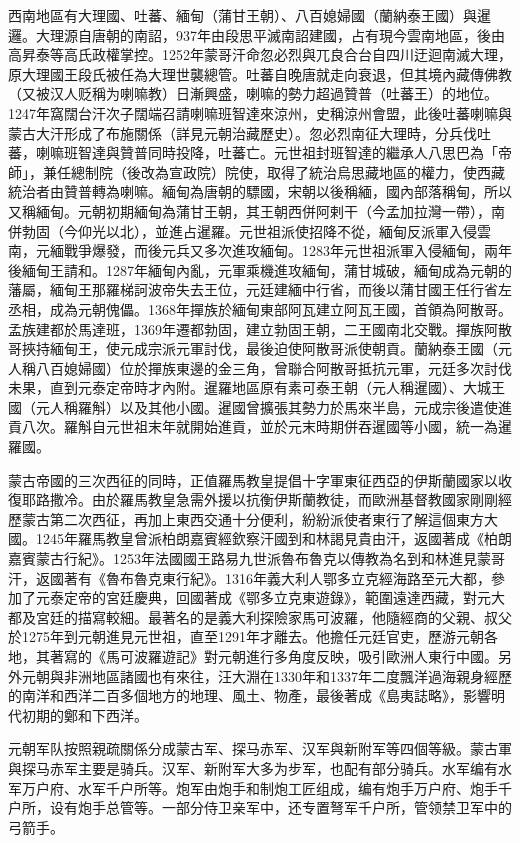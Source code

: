 西南地區有大理國、吐蕃、緬甸（蒲甘王朝）、八百媳婦國（蘭納泰王國）與暹邏。大理源自唐朝的南詔，937年由段思平滅南詔建國，占有現今雲南地區，後由高昇泰等高氏政權掌控。1252年蒙哥汗命忽必烈與兀良合台自四川迂迴南滅大理，原大理國王段氏被任為大理世襲總管。吐蕃自晚唐就走向衰退，但其境內藏傳佛教（又被汉人贬稱为喇嘛教）日漸興盛，喇嘛的勢力超過贊普（吐蕃王）的地位。1247年窩闊台汗次子闊端召請喇嘛班智達來涼州，史稱涼州會盟，此後吐蕃喇嘛與蒙古大汗形成了布施關係（詳見元朝治藏歷史）。忽必烈南征大理時，分兵伐吐蕃，喇嘛班智達與贊普同時投降，吐蕃亡。元世祖封班智達的繼承人八思巴為「帝師」，兼任總制院（後改為宣政院）院使，取得了統治烏思藏地區的權力，使西藏統治者由贊普轉為喇嘛。緬甸為唐朝的驃國，宋朝以後稱緬，國內部落稱甸，所以又稱緬甸。元朝初期緬甸為蒲甘王朝，其王朝西併阿剌干（今孟加拉灣一帶），南併勃固（今仰光以北），並進占暹羅。元世祖派使招降不從，緬甸反派軍入侵雲南，元緬戰爭爆發，而後元兵又多次進攻緬甸。1283年元世祖派軍入侵緬甸，兩年後緬甸王請和。1287年緬甸內亂，元軍乘機進攻緬甸，蒲甘城破，緬甸成為元朝的藩屬，緬甸王那羅梯訶波帝失去王位，元廷建緬中行省，而後以蒲甘國王任行省左丞相，成為元朝傀儡。1368年撣族於緬甸東部阿瓦建立阿瓦王國，首領為阿散哥。孟族建都於馬達班，1369年遷都勃固，建立勃固王朝，二王國南北交戰。撣族阿散哥挾持緬甸王，使元成宗派元軍討伐，最後迫使阿散哥派使朝貢。蘭納泰王國（元人稱八百媳婦國）位於撣族東邊的金三角，曾聯合阿散哥抵抗元軍，元廷多次討伐未果，直到元泰定帝時才內附。暹羅地區原有素可泰王朝（元人稱暹國）、大城王國（元人稱羅斛）以及其他小國。暹國曾擴張其勢力於馬來半島，元成宗後遣使進貢八次。羅斛自元世祖末年就開始進貢，並於元末時期併吞暹國等小國，統一為暹羅國。

蒙古帝國的三次西征的同時，正值羅馬教皇提倡十字軍東征西亞的伊斯蘭國家以收復耶路撒冷。由於羅馬教皇急需外援以抗衡伊斯蘭教徒，而歐洲基督教國家剛剛經歷蒙古第二次西征，再加上東西交通十分便利，紛紛派使者東行了解這個東方大國。1245年羅馬教皇曾派柏朗嘉賓經欽察汗國到和林謁見貴由汗，返國著成《柏朗嘉賓蒙古行紀》。1253年法國國王路易九世派魯布魯克以傳教為名到和林進見蒙哥汗，返國著有《魯布魯克東行紀》。1316年義大利人鄂多立克經海路至元大都，參加了元泰定帝的宮廷慶典，回國著成《鄂多立克東遊錄》，範圍遠達西藏，對元大都及宮廷的描寫較細。最著名的是義大利探險家馬可波羅，他隨經商的父親、叔父於1275年到元朝進見元世祖，直至1291年才離去。他擔任元廷官吏，歷游元朝各地，其著寫的《馬可波羅遊記》對元朝進行多角度反映，吸引歐洲人東行中國。另外元朝與非洲地區諸國也有來往，汪大淵在1330年和1337年二度飄洋過海親身經歷的南洋和西洋二百多個地方的地理、風土、物產，最後著成《島夷誌略》，影響明代初期的鄭和下西洋。

元朝军队按照親疏關係分成蒙古军、探马赤军、汉军與新附军等四個等級。蒙古軍與探马赤军主要是骑兵。汉军、新附军大多为步军，也配有部分骑兵。水军编有水军万户府、水军千户所等。炮军由炮手和制炮工匠组成，编有炮手万户府、炮手千户所，设有炮手总管等。一部分侍卫亲军中，还专置弩军千户所，管领禁卫军中的弓箭手。

